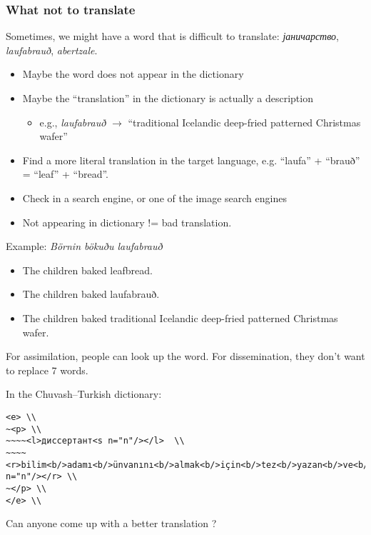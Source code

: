 \documentclass[10pt,xetex]{beamer} %
\begin{document}
\begin{frame}
  \frametitle{What not to translate}

Sometimes, we might have a word that is difficult to translate: {\em јаничарство}, {\em laufabrauð},  {\em abertzale}.

\begin{itemize}
  \item Maybe the word does not appear in the dictionary
  \item Maybe the ``translation'' in the dictionary is actually a description
  \begin{itemize}
    \item e.g., {\em laufabrauð} $\rightarrow$ ``traditional Icelandic deep-fried patterned Christmas wafer''
  \end{itemize}
\end{itemize}


\begin{itemize}
  \item Find a more literal translation in the target language, e.g. ``laufa'' + ``brauð'' = ``leaf'' + ``bread''.
   \item Check in a search engine, or one of the image search engines
   \item  Not appearing in dictionary != bad translation.
\end{itemize}
Example: {\em Börnin bökuðu laufabrauð}

\begin{itemize}
\item The children baked leafbread.
\item The children baked laufabrauð.
\item The children baked traditional Icelandic deep-fried patterned Christmas wafer.
\end{itemize}

For assimilation, people can look up the word. For dissemination, they don't want to replace 7 words.
\end{frame}

\begin{frame}[fragile]

In the Chuvash--Turkish dictionary:

\begin{verbatim}
<e> \\
~<p> \\
~~~~<l>диссертант<s n="n"/></l>  \\
~~~~<r>bilim<b/>adamı<b/>ünvanını<b/>almak<b/>için<b/>tez<b/>yazan<b/>ve<b/>savunan<b/>kişi<s n="n"/></r> \\
~</p> \\
</e> \\
\end{verbatim}

Can anyone come up with a better translation ?

\end{frame}
\end{document}
